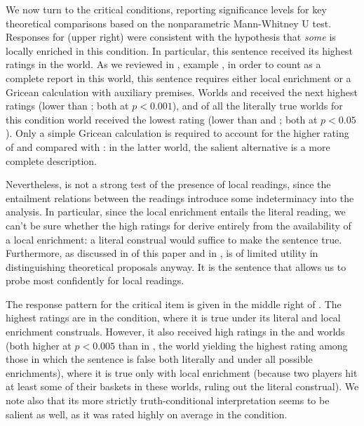 \documentclass[leqno,12pt]{article}
\begin{document}
We now turn to the critical conditions, reporting significance levels
for key theoretical comparisons based on the nonparametric
Mann-Whitney U test. Responses for  (upper right)
were consistent with the hypothesis that \emph{some} is locally
enriched in this condition. In particular, this sentence received its
highest ratings in the  world. As we reviewed in
, example , in order to
count as a complete report in this world, this sentence requires
either local enrichment or a Gricean calculation with auxiliary
premises. Worlds  and  received the next highest
ratings (lower than ; both at $p<0.001$), and of all the
literally true worlds for this condition world  received
the lowest rating (lower than  and ; both at
$p<0.05$).  Only a simple Gricean calculation is required to account
for the higher rating of  and  compared with
: in the latter world, the salient alternative  is a more complete description.

Nevertheless,  is not a strong test of the
presence of local readings, since the entailment relations between the
readings introduce some indeterminacy into the analysis. In
particular, since the local enrichment entails the literal reading, we
can't be sure whether the high ratings for  derive entirely
from the availability of a local enrichment: a literal construal would
suffice to make the sentence true. Furthermore, as discussed in
 of this paper and in
\citeauthor{Chemla:Spector:2011},  is of limited
utility in distinguishing theoretical proposals anyway. It is the
 sentence that allows us to probe most
confidently for local readings.

The response pattern for the critical item 
is given in the middle right of . The highest
ratings are in the  condition, where it is true under its
literal and local enrichment construals. However, it also received
high ratings in the  and  worlds (both higher at
$p<0.005$ than in , the world yielding the highest rating
among those in which the sentence is false both literally and under
all possible enrichments), where it is true only with local enrichment
(because two players hit at least some of their baskets in these
worlds, ruling out the literal construal).  We note also that its more
strictly truth-conditional interpretation seems to be salient as well,
as it was rated highly on average in the  condition.
\end{document}
